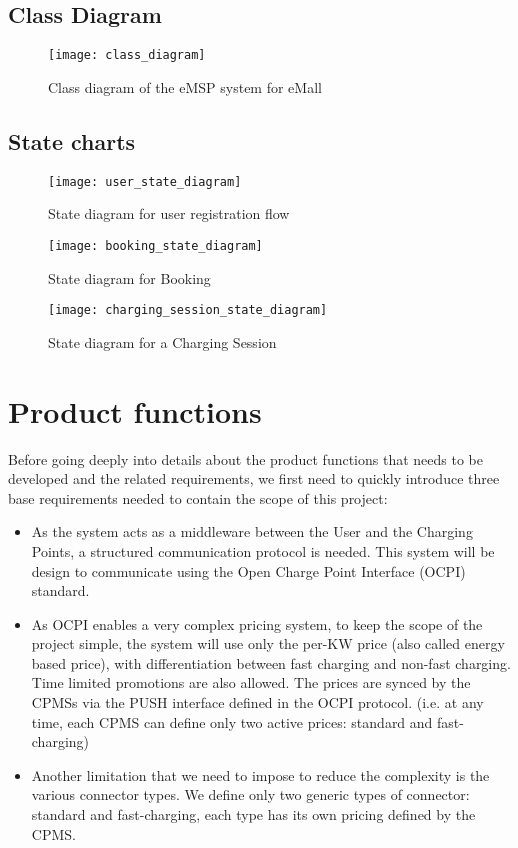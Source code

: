 \newpage

\subsection{Class Diagram}

\begin{figure}[h]
\centering
\texttt{[image: class\_diagram]}
\caption{Class diagram of the eMSP system for eMall}
\end{figure}

\clearpage
\newpage

\subsection{State charts}

\begin{figure}[h]
\centering
\texttt{[image: user\_state\_diagram]}
\caption{State diagram for user registration flow}
\end{figure}

\begin{figure}[h]
\centering
\texttt{[image: booking\_state\_diagram]}
\caption{State diagram for Booking}
\end{figure}

\begin{figure}[h]
\centering
\texttt{[image: charging\_session\_state\_diagram]}
\caption{State diagram for a Charging Session}
\end{figure}

\clearpage
\newpage


\section{Product functions}
Before going deeply into details about the product functions that needs to be developed and the related requirements, we first need to quickly introduce three base requirements needed to contain the scope of this project:\\

\begin{itemize}
	\item As the system acts as a middleware between the User and the Charging Points, a structured communication protocol is needed. This system will be design to communicate using the Open Charge Point Interface (OCPI) standard.
	\item As OCPI enables a very complex pricing system, to keep the scope of the project simple, the system will use only the per-KW price (also called energy based price), with differentiation between fast charging and non-fast charging. Time limited promotions are also allowed. The prices are synced by the CPMSs via the PUSH interface defined in the OCPI protocol. (i.e. at any time, each CPMS can define only two active prices: standard and fast-charging)
	\item Another limitation that we need to impose to reduce the complexity is the various connector types. We define only two generic types of connector: standard and fast-charging, each type has its own pricing defined by the CPMS.
\end{itemize}

